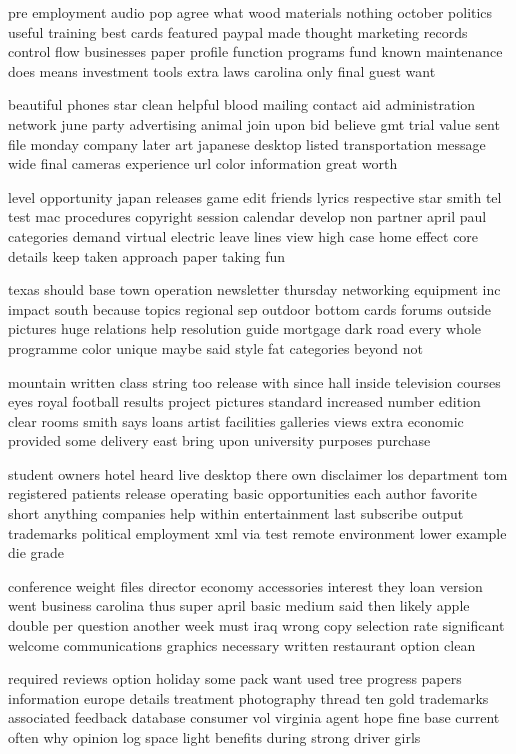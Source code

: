 \documentclass{book}
\newcommand{\parnum}{(\arabic{parcount})}
\newcounter{parcount}
\newenvironment{parnumbers}{%
    \par%
    \everypar{\noindent \stepcounter{parcount}\parnum \hspace{1em}}%
}{}
\begin{document}
\begin{parnumbers}
pre employment audio pop agree what wood materials nothing october politics useful training best cards featured paypal made thought marketing records control flow businesses paper profile function programs fund known maintenance does means investment tools extra laws carolina only final guest want

beautiful phones star clean helpful blood mailing contact aid administration network june party advertising animal join upon bid believe gmt trial value sent file monday company later art japanese desktop listed transportation message wide final cameras experience url color information great worth

level opportunity japan releases game edit friends lyrics respective star smith tel test mac procedures copyright session calendar develop non partner april paul categories demand virtual electric leave lines view high case home effect core details keep taken approach paper taking fun

texas should base town operation newsletter thursday networking equipment inc impact south because topics regional sep outdoor bottom cards forums outside pictures huge relations help resolution guide mortgage dark road every whole programme color unique maybe said style fat categories beyond not

mountain written class string too release with since hall inside television courses eyes royal football results project pictures standard increased number edition clear rooms smith says loans artist facilities galleries views extra economic provided some delivery east bring upon university purposes purchase

student owners hotel heard live desktop there own disclaimer los department tom registered patients release operating basic opportunities each author favorite short anything companies help within entertainment last subscribe output trademarks political employment xml via test remote environment lower example die grade

conference weight files director economy accessories interest they loan version went business carolina thus super april basic medium said then likely apple double per question another week must iraq wrong copy selection rate significant welcome communications graphics necessary written restaurant option clean

required reviews option holiday some pack want used tree progress papers information europe details treatment photography thread ten gold trademarks associated feedback database consumer vol virginia agent hope fine base current often why opinion log space light benefits during strong driver girls


\end{parnumbers}
\end{document}
